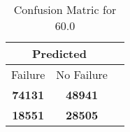 \begin{table}[] 
\label{Table: Prediction Accuracy-DMD60.0OnlySunEKF-resetReflection-Reflection} 
\caption{Confusion Matric for 60.0} 
\centering 
\begin{tabular} 
 {@{}ccc@{}} 
\toprule 
\multicolumn{2}{c}{\textbf{Predicted}}
 \\ \midrule 
\multicolumn{1}{|c|}{Failure} & 
\multicolumn{1}{c|}{No Failure}
 \\ \midrule 
\multicolumn{1}{|c|}{\color{green}\textbf{74131}} & 
\multicolumn{1}{c|}{\color{green}\textbf{48941}}
 \\ \midrule 
\multicolumn{1}{|c|}{\color{red}\textbf{18551}} & 
\multicolumn{1}{c|}{\color{red}\textbf{28505}}
 \\ \bottomrule 
\end{tabular} 
\end{table} 
